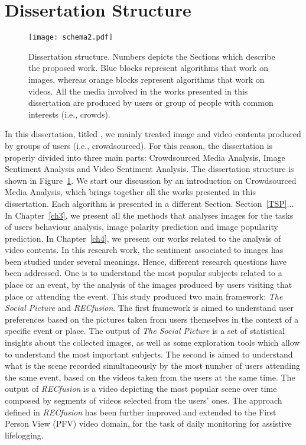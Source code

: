 \section{Dissertation Structure}
\begin{figure}[t]
	\centering
	\texttt{[image: schema2.pdf]}
	\caption{Dissertation structure. Numbers depicts the Sections which describe the proposed work. Blue blocks represent algorithms that work on images, whereas orange blocks represent algorithms that work on videos. All the media involved in the works presented in this dissertation are produced by users or group of people with common interests (i.e., crowds).
	}
	\label{figDissertationSchema}
\end{figure}
In this dissertation, titled , we mainly treated image and video contents produced by groups of users (i.e., crowdsourced).
For this reason, the dissertation is properly divided into three main parts: Crowdsourced Media Analysis, Image Sentiment Analysis and Video Sentiment Analysis.
The dissertation structure is shown in Figure~\ref{figDissertationSchema}. We start our discussion by an introduction on Crowdsourced Media Analysis, which brings together all the works presented in this dissertation. Each algorithm is presented in a different Section. 
Section~\ref{TSP}... In Chapter~\ref{ch3}, we present all the methods that analyses images for the tasks of users behaviour analysis, image polarity prediction and image popularity prediction.
In Chapter~\ref{ch4}, we present our works related to the analysis of video contents.
In this research work, the sentiment associated to images has been studied under several meanings. Hence, different research questions have been addressed. 
One is to understand the most popular subjects related to a place or an event, by the analysis of the images produced by users visiting that place or attending the event. This study produced two main framework: \textit{The Social Picture} and \textit{RECfusion}. The first framework is aimed to understand user preferences based on the pictures taken from users themselves in the context of a specific event or place. The output of \textit{The Social Picture} is a set of statistical insights about the collected images, as well as some exploration tools which allow to understand the most important subjects. The second is aimed to understand what is the scene recorded simultaneously by the most number of users attending the same event, based on the videos taken from the users at the same time. The output of \textit{RECfusion} is a video depicting the most popular scene over time composed by segments of videos selected from the users' ones.
The approach defined in \textit{RECfusion} has been further improved and extended to the First Person View (PFV) video domain, for the task of daily monitoring for assistive lifelogging.




